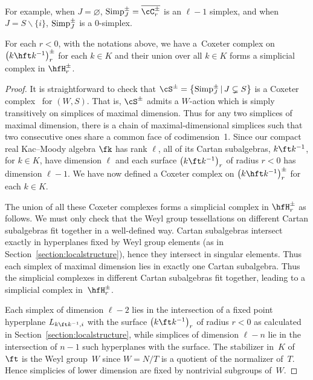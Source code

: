 For example, when $J = \varnothing$, ${\rm Simp}_J^\pm = \overline{\cC^\pm_r}$ is an $\ell-1$ simplex, and when $J = S\backslash \{i\}$, ${\rm Simp}_J^\pm$ is a $0$-simplex.

\begin{Theorem}\label{theorem:simplicial_structure}
For each $r<0$, with the notations above, we have a~Coxeter complex on $\big(k\hft k^{-1}\big)_r^\pm$ for each $k\in K$ and their union over all $k\in K$ forms a simplicial complex in $\hfH_r^\pm$.
\end{Theorem}

\begin{proof}It is straightforward to check that $\cS^\pm = \big\{{\rm Simp}_J^\pm\,|\, J\subsetneq S\big\}$ is a Coxeter complex~\cite{AbramenkoBrown08} for $(W,S)$. That is, $\cS^\pm$ admits a $W$-action which is simply transitively on simplices of maximal dimension. Thus for any two simplices of maximal dimension, there is a chain of maximal-dimensional simplices such that two consecutive ones share a common face of codimension~1. Since our compact real Kac--Moody algebra $\fk$ has rank $\ell$, all of its
Cartan subalgebras, $k\ft k^{-1}$, for $k\in K$, have dimension $\ell$ and each surface $\big(k\ft k^{-1}\big)_r$ of radius $r < 0$ has dimension $\ell-1$. We have now defined a Coxeter complex on $\big(k\hft k^{-1}\big)_r^\pm$ for each $k\in K$.

The union of all these Coxeter complexes forms a simplicial complex in $\hfH_r^\pm$ as follows. We must only check that the Weyl group tessellations on different Cartan subalgebras fit together in a well-defined way. Cartan subalgebras intersect exactly in hyperplanes fixed by Weyl group elements (as in Section~\ref{section:localstructure}), hence they intersect in singular elements. Thus each simplex of
maximal dimension lies in exactly one Cartan subalgebra. Thus the simplicial complexes in different Cartan subalgebras fit together, leading to a simplicial complex in~$\hfH_r^\pm$.

Each simplex of dimension $\ell-2$ lies in the intersection of a fixed point hyperplane $L_{k\ft k^{-1},i}$ with the surface $\big(k\ft k^{-1}\big)_r$ of radius $r < 0$ as calculated in Section~\ref{section:localstructure}, while simplices of dimension $\ell-n$ lie in the intersection of $n-1$ such hyperplanes with the surface. The stabilizer in~$K$ of~$\ft$ is the Weyl group~$W$ since $W=N/T$ is a quotient of the normalizer of~$T$. Hence simplicies of lower dimension are fixed by nontrivial subgroups of~$W$.
\end{proof}

